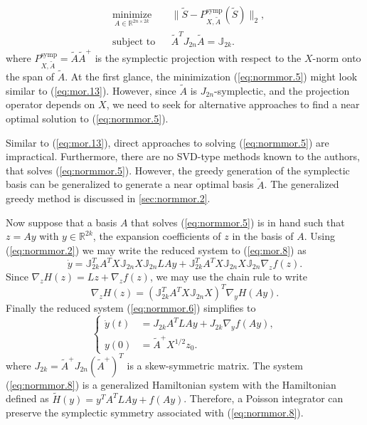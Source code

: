 \begin{equation} \label{eq:normmor.5}
\begin{aligned}
& \underset{A\in \mathbb{R}^{2n\times 2k}}{\text{minimize}}
& & \| \tilde S - P^\text{symp}_{X,\tilde A}(\tilde S) \|_2, \\
& \text{subject to}
& & \tilde A^T J_{2n} \tilde A = \mathbb J_{2k}.
\end{aligned}
\end{equation}
where $P^\text{symp}_{X,\tilde A} = \tilde A \tilde A^+$ is the symplectic projection with respect to the $X$-norm onto the span of $\tilde A$. At the first glance, the minimization (\ref{eq:normmor.5}) might look similar to (\ref{eq:mor.13}). However, since $\tilde A$ is $J_{2n}$-symplectic, and the projection operator depends on $X$, we need to seek for alternative approaches to find a near optimal solution to (\ref{eq:normmor.5}). 

Similar to (\ref{eq:mor.13}), direct approaches to solving (\ref{eq:normmor.5}) are impractical. Furthermore, there are no SVD-type methods known to the authors, that solves (\ref{eq:normmor.5}). However, the greedy generation of the symplectic basis can be generalized to generate a near optimal basis $\tilde A$. The generalized greedy method is discussed in \cref{sec:normmor.2}.

Now suppose that a basis $A$ that solves (\ref{eq:normmor.5}) is in hand such that $z = Ay$ with $y\in \mathbb R^{2k}$, the expansion coefficients of $z$ in the basis of $A$. Using (\ref{eq:normmor.2}) we may write the reduced system to (\ref{eq:mor.8}) as
\begin{equation} \label{eq:normmor.6}
	\dot y = \mathbb J_{2k}^T A^T X \mathbb J_{2n} X \mathbb{J}_{2n} LAy + \mathbb J_{2k}^T A^T X \mathbb J_{2n} X \mathbb{J}_{2n} \nabla_z f(z).
\end{equation}
Since $\nabla_z H(z) = Lz + \nabla_z f(z)$, we may use the chain rule to write
\begin{equation} \label{eq:normmor.7}
	\nabla_z H(z) = ( \mathbb J_{2k}^T A^T X \mathbb J_{2n} X )^T \nabla_y H(Ay).
\end{equation}
Finally the reduced system (\ref{eq:normmor.6}) simplifies to
\begin{equation} \label{eq:normmor.8}
\left\{
\begin{aligned}
	\dot y(t) &= J_{2k} A^T L A y + J_{2k} \nabla_y f(Ay), \\
	y(0) &= \tilde A^+ X^{1/2} z_0.
\end{aligned}
\right.
\end{equation}
where $J_{2k}=\tilde A^+ J_{2n} (\tilde A^+)^T$ is a skew-symmetric matrix. The system (\ref{eq:normmor.8}) is a generalized Hamiltonian system with the Hamiltonian defined as $\tilde H(y) = y^TA^TLAy + f(Ay)$. Therefore, a Poisson integrator can preserve the symplectic symmetry associated with (\ref{eq:normmor.8}). 


